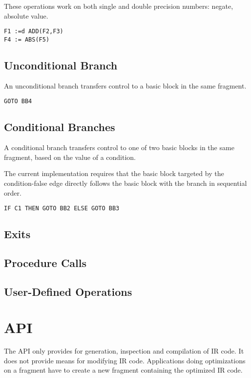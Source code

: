 \documentclass{article}
\begin{document}
These operations work on both single and double precision numbers:
negate, absolute value.

\begin{verbatim}
F1 :=d ADD(F2,F3)
F4 := ABS(F5)
\end{verbatim}

\subsection{Unconditional Branch}

An unconditional branch transfers control to a basic block in the same
fragment.

\begin{verbatim}
GOTO BB4
\end{verbatim}

\subsection{Conditional Branches}

A conditional branch transfers control to one of two basic blocks in
the same fragment, based on the value of a condition.

The current implementation requires that the basic block targeted by
the condition-false edge directly follows the basic block with the
branch in sequential order.

\begin{verbatim}
IF C1 THEN GOTO BB2 ELSE GOTO BB3
\end{verbatim}

\subsection{Exits}

\subsection{Procedure Calls}

\subsection{User-Defined Operations}

\section{API}

The API only provides for generation, inspection and compilation of IR
code.  It does not provide means for modifying IR code.  Applications
doing optimizations on a fragment have to create a new fragment
containing the optimized IR code.
\end{document}
